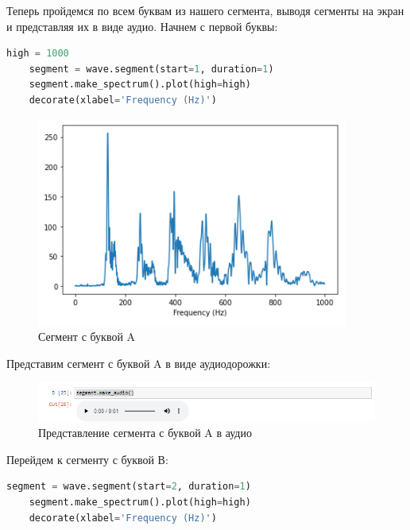 \documentclass[a4paper]{article}
\begin{document}
            Теперь пройдемся по всем буквам из нашего сегмента, выводя сегменты на экран и представляя их в виде аудио. Начнем с первой буквы:
            
\begin{lstlisting}[language=Python, caption= Сегмент с буквой A]
    high = 1000
    segment = wave.segment(start=1, duration=1)
    segment.make_spectrum().plot(high=high)
    decorate(xlabel='Frequency (Hz)')
\end{lstlisting}   
            
             \begin{figure}[H]
                \centering
                \includegraphics{ex_6_letter_a_segment.png}
                \caption{Сегмент с буквой A}
                \label{fig:ex_6_letter_a_segment}
            \end{figure}
            
            Представим сегмент с буквой A в виде аудиодорожки:
            
            \begin{figure}[H]
                \centering
                \includegraphics[width=\textwidth]{ex_6_letter_a_audio.png}
                \caption{Представление сегмента с буквой A в аудио}
                \label{fig:ex_6_letter_a_audio}
            \end{figure}
            
            Перейдем к сегменту с буквой В:
            
\begin{lstlisting}[language=Python, caption= Сегмент с буквой B]
    segment = wave.segment(start=2, duration=1)
    segment.make_spectrum().plot(high=high)
    decorate(xlabel='Frequency (Hz)')
\end{lstlisting}   
            
\end{document}
